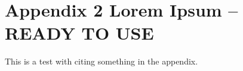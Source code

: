 

\chapter{Appendix 2 Lorem Ipsum -- READY TO USE}\label{app:lorem_ipsum2}

This is a test with citing something \cite{8093778} in the appendix.

\lipsum[1-2]

